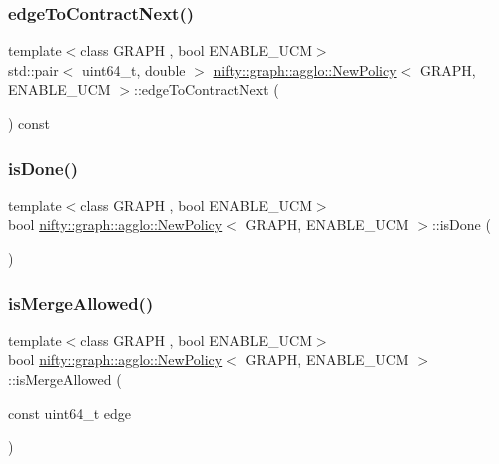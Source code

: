 \subsubsection{\texorpdfstring{edge\+To\+Contract\+Next()}{edgeToContractNext()}}
{\footnotesize\ttfamily template$<$class G\+R\+A\+PH , bool E\+N\+A\+B\+L\+E\+\_\+\+U\+CM$>$ \\
std\+::pair$<$ uint64\+\_\+t, double $>$ \hyperlink{classnifty_1_1graph_1_1agglo_1_1NewPolicy}{nifty\+::graph\+::agglo\+::\+New\+Policy}$<$ G\+R\+A\+PH, E\+N\+A\+B\+L\+E\+\_\+\+U\+CM $>$\+::edge\+To\+Contract\+Next (\begin{DoxyParamCaption}{ }\end{DoxyParamCaption}) const\hspace{0.3cm}{\ttfamily [inline]}}

\mbox{\label{classnifty_1_1graph_1_1agglo_1_1NewPolicy_adb2e0454a5fdd281efd72ef5f049c482}} 
\subsubsection{\texorpdfstring{is\+Done()}{isDone()}}
{\footnotesize\ttfamily template$<$class G\+R\+A\+PH , bool E\+N\+A\+B\+L\+E\+\_\+\+U\+CM$>$ \\
bool \hyperlink{classnifty_1_1graph_1_1agglo_1_1NewPolicy}{nifty\+::graph\+::agglo\+::\+New\+Policy}$<$ G\+R\+A\+PH, E\+N\+A\+B\+L\+E\+\_\+\+U\+CM $>$\+::is\+Done (\begin{DoxyParamCaption}{ }\end{DoxyParamCaption})\hspace{0.3cm}{\ttfamily [inline]}}

\mbox{\label{classnifty_1_1graph_1_1agglo_1_1NewPolicy_a135e5c2612afce2172cc4a3ac47a66cc}} 
\subsubsection{\texorpdfstring{is\+Merge\+Allowed()}{isMergeAllowed()}}
{\footnotesize\ttfamily template$<$class G\+R\+A\+PH , bool E\+N\+A\+B\+L\+E\+\_\+\+U\+CM$>$ \\
bool \hyperlink{classnifty_1_1graph_1_1agglo_1_1NewPolicy}{nifty\+::graph\+::agglo\+::\+New\+Policy}$<$ G\+R\+A\+PH, E\+N\+A\+B\+L\+E\+\_\+\+U\+CM $>$\+::is\+Merge\+Allowed (\begin{DoxyParamCaption}\item[{const uint64\+\_\+t}]{edge }\end{DoxyParamCaption})\hspace{0.3cm}{\ttfamily [inline]}}

